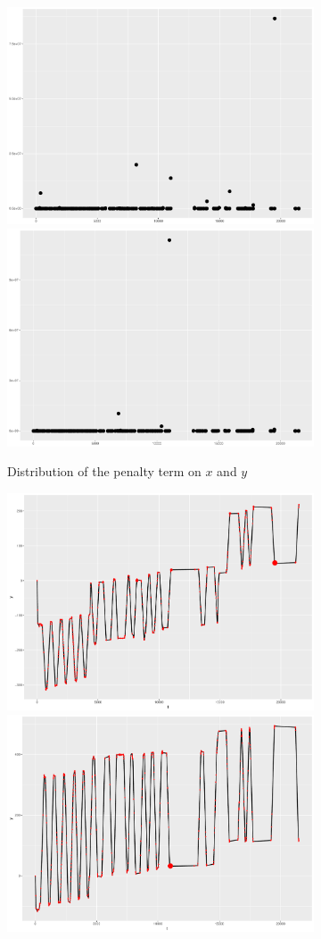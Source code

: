 \begin{figure}
    \centering
    \begin{subfigure}{\textwidth}
    \centering
    \includegraphics[width=0.45\linewidth]{Chapters/02TractorSplineTheory/plot/ggplot/ggRealdataXPenaltyLine2.pdf}
    \includegraphics[width=0.45\linewidth]{Chapters/02TractorSplineTheory/plot/ggplot/ggRealdataYPenaltyLine2.pdf}
    \caption{Distribution of the penalty term on $x$ and $y$}\label{penaltyxyggXYLine}
    \end{subfigure}
    \begin{subfigure}{\textwidth}
    \centering
    \includegraphics[width=0.45\linewidth]{Chapters/02TractorSplineTheory/plot/ggplot/ggRealdataXPenaltyPath2.pdf}
    \includegraphics[width=0.45\linewidth]{Chapters/02TractorSplineTheory/plot/ggplot/ggRealdataYPenaltyPath2.pdf}

\end{subfigure}
\end{figure}
